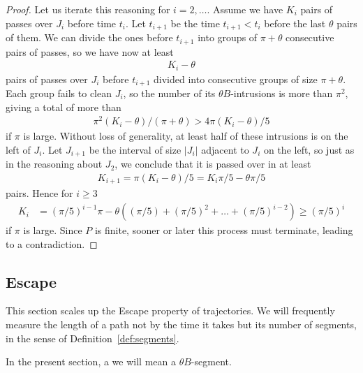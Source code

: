 \documentclass[11pt]{memoir}
\theoremstyle{definition} %
\renewcommand{\ge}{\geq}
\def\B{B}
\newcommand{\passno}{\pi}
\begin{document}
\begin{proof}
Let us iterate this reasoning for \( i=2,\dots. \)
Assume we have \( K_{i} \) pairs of passes over \( J_{i} \) before time \( t_{i} \).
Let \( t_{i+1} \) be the  time \( t_{i+1}<t_{i} \) before
the last \( \theta \) pairs of them.
We can divide the ones before \( t_{i+1} \)
into groups of \( \passno+\theta \) consecutive pairs of passes, so we have now at least
\begin{align*}
   K_{i}-\theta
\end{align*}
pairs of passes over \( J_{i} \) before \( t_{i+1} \) divided into consecutive groups of size \( \passno+\theta \).
Each group fails to clean \( J_{i} \), so the number of its \( \theta\B \)-intrusions is more than \( \passno^{2} \),
giving a total of more than
\begin{align*}
 \passno^{2}(K_{i}-\theta)/(\passno+\theta)  > 4\passno(K_{i}-\theta)/5
\end{align*}
if \( \passno \) is large.
Without loss of generality, at least half of these intrusions is on the left of \( J_{i} \).
Let \( J_{i+1} \) be the interval of size \( |J_{i}| \) adjacent to \( J_{i} \) on the left, so just as in the reasoning
about \( J_{2} \), we conclude that it is passed over in at least
 \begin{align}\label{eq:K-next}
   K_{i+1}=\passno(K_{i}-\theta)/5  = K_{i}\passno /5- \theta\passno/5
 \end{align}
 pairs.
Hence for \( i\ge 3 \)
\begin{align*}
  K_{i} &= (\passno/5)^{i-1}\passno -\theta((\passno/5)+(\passno/5)^{2}+\dots+(\passno/5)^{i-2})
\ge (\passno/5)^{i}
\end{align*}
if \( \passno \) is large.
Since \( P \) is finite, sooner or later this process must terminate, leading to a contradiction.
\end{proof}

\subsection{Escape}\label{sec:escape}

This section scales up the Escape property of trajectories.
We will frequently measure the length of a path not by the time it takes but its number of segments,
in the sense of Definition~\ref{def:segments}.

\begin{definition}\label{def:segments-spec}
  In the present section, a  we will mean a \( \theta\B \)-segment.
\end{definition}
\end{document}
